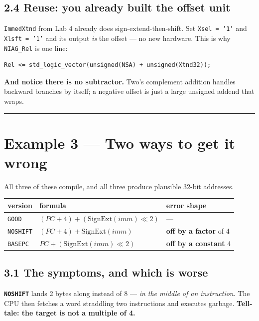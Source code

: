 \documentclass[11pt]{article}
\newcommand{\code}[1]{\texttt{#1}}
\newcommand{\hr}{\vspace{2pt}\hrule\vspace{6pt}}
\begin{document}
\subsection*{2.4 Reuse: you already built the offset unit}

\code{ImmedXtnd} from Lab 4 already does sign-extend-then-shift. Set
\code{Xsel = '1'} and \code{Xlsft = '1'} and its output \emph{is} the offset ---
no new hardware. This is why \code{NIAG\_Rel} is one line:

\begin{lstlisting}
Rel <= std_logic_vector(unsigned(NSA) + unsigned(Xtnd32));
\end{lstlisting}

\textbf{And notice there is no subtractor.} Two's complement addition handles
backward branches by itself; a negative offset is just a large unsigned addend
that wraps.

\vspace{4pt}\hr

\section*{Example 3 --- Two ways to get it wrong}

All three of these compile, and all three produce plausible 32-bit addresses.

\begin{center}
\small
\begin{tabular}{l>{\raggedright\arraybackslash}p{6.4cm}>{\raggedright\arraybackslash}p{5.4cm}}
\toprule
version & formula & error shape \\
\midrule
\code{GOOD} & $(PC+4) + (\text{SignExt}(imm) \ll 2)$ & --- \\
\code{NOSHIFT} & $(PC+4) + \text{SignExt}(imm)$ & \textbf{off by a factor} of 4 \\
\code{BASEPC} & $PC + (\text{SignExt}(imm) \ll 2)$ & \textbf{off by a constant} 4 \\
\bottomrule
\end{tabular}
\end{center}

\subsection*{3.1 The symptoms, and which is worse}

\textbf{\code{NOSHIFT}} lands 2 bytes along instead of 8 --- \emph{in the middle
of an instruction}. The CPU then fetches a word straddling two instructions and
executes garbage. \textbf{Tell-tale: the target is not a multiple of 4.}
\end{document}
